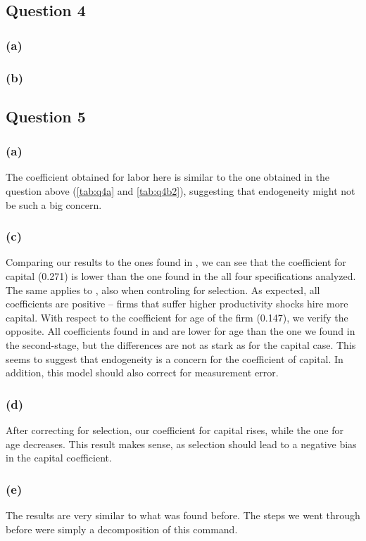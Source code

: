 \documentclass[11pt]{article}
\begin{document}
\subsection*{Question 4} \label{q4}
\subsubsection*{(a)}

\FloatBarrier

\subsubsection*{(b)}


\FloatBarrier

\subsection*{Question 5} \label{q5}
\subsubsection*{(a)}

\FloatBarrier
The coefficient obtained for labor here is similar to the one obtained in the question above (\autoref{tab:q4a} and \autoref{tab:q4b2}), suggesting that endogeneity might not be such a big concern. 

\subsubsection*{(c)}

\FloatBarrier
Comparing our results to the ones found in , we can see that the coefficient for capital (0.271) is lower than the one found in the all four specifications analyzed. The same applies to , also when controling for selection. As expected, all coefficients are positive -- firms that suffer higher productivity shocks hire more capital. 
With respect to the coefficient for age of the firm (0.147), we verify the opposite. All coefficients found in  and  are lower for age than the one we found in the second-stage, but the differences are not as stark as for the capital case. 
This seems to suggest that endogeneity is a concern for the coefficient of capital. In addition, this model should also correct for measurement error.  
\newpage
\subsubsection*{(d)}

\FloatBarrier
After correcting for selection, our coefficient for capital rises, while the one for age decreases. 
This result makes sense, as selection should lead to a negative bias in the capital coefficient. 
\subsubsection*{(e)}

\FloatBarrier

The results are very similar to what was found before. The steps we went through before were simply a decomposition of this command.  
\end{document}
